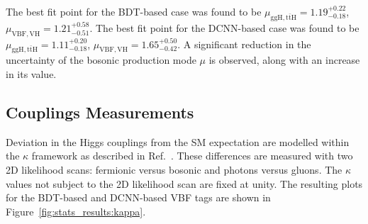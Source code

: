 The best fit point for the BDT-based case was found to be $\mu_{\mathrm{ggH},\mathrm{t\bar{t}H}} = 1.19^{+0.22}_{-0.18}$, $\mu_{\mathrm{VBF},\mathrm{VH}} = 1.21^{+0.58}_{-0.51}$.
The best fit point for the DCNN-based case was found to be $\mu_{\mathrm{ggH},\mathrm{t\bar{t}H}} = 1.11^{+0.20}_{-0.18}$, $\mu_{\mathrm{VBF},\mathrm{VH}} = 1.65^{+0.50}_{-0.42}$.
A significant reduction in the uncertainty of the bosonic production mode $\mu$ is observed, along with an increase in its value.





\subsection{Couplings Measurements}
Deviation in the Higgs couplings from the SM expectation are modelled within the $\kappa$ framework as described in Ref.~\cite{Kappa}.
These differences are measured with two 2D likelihood scans: fermionic versus bosonic and photons versus gluons.
The $\kappa$ values not subject to the 2D likelihood scan are fixed at unity.
The resulting plots for the BDT-based and DCNN-based VBF tags are shown in Figure~\ref{fig:stats_results:kappa}.
